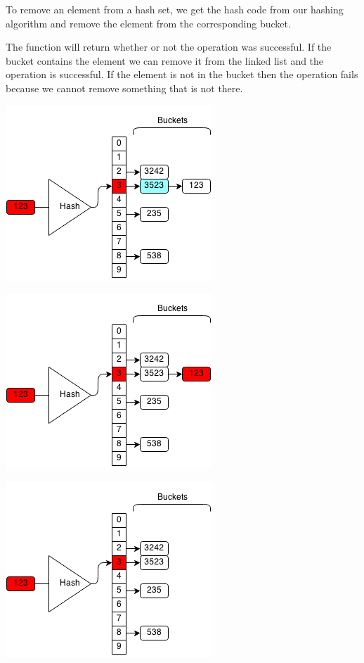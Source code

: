 \documentclass[11pt,oneside]{book}
\makeatletter
\def\maxwidth#1{\ifdim\Gin@nat@width>#1 #1\else\Gin@nat@width\fi}
\makeatother
\begin{document}
To remove an element from a hash set, we get the hash code from our hashing algorithm and remove the element from the corresponding bucket.

The function will return whether or not the operation was successful. If the bucket contains the element we can remove it from the linked list and the operation is successful. If the element is not in the bucket then the operation fails because we cannot remove something that is not there.

\includegraphics[width=\maxwidth{\textwidth}]{hashsetrem.png}

\includegraphics[width=\maxwidth{\textwidth}]{hashsetrem2.png}

\includegraphics[width=\maxwidth{\textwidth}]{hashsetrem3.png}
\end{document}
